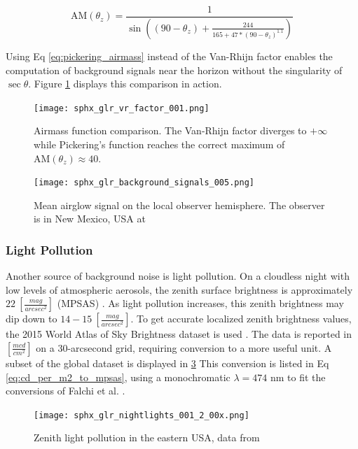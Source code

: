 \begin{equation} \label{eq:pickering_airmass}
  \textrm{AM}(\theta_z) = \frac{1}{\sin\left((90 - \theta_z) +  \frac{244}{165 + 47 * \left(90 - \theta_z \right)^{1.1}}\right)}
\end{equation}

Using Eq \ref{eq:pickering_airmass} instead of the Van-Rhijn factor enables the computation of background signals near the horizon without the singularity of $\sec{\theta}$. Figure \ref{fig:airmass_fcns} displays this comparison in action.

\begin{figure}[ht]
  \centering
  \texttt{[image: sphx\_glr\_vr\_factor\_001.png]}
  \caption{Airmass function comparison. The Van-Rhijn factor diverges to $+\infty$ while Pickering's function reaches the correct maximum of $\textrm{AM}(\theta_z) \approx 40$.}
  \label{fig:airmass_fcns}
\end{figure}

\begin{figure}[ht]
  \centering
  \texttt{[image: sphx\_glr\_background\_signals\_005.png]}
  \caption{Mean airglow signal on the local observer hemisphere. The observer is in New Mexico, USA at
  \pogslla}
  \label{fig:airglowhemi}
\end{figure}

\subsubsection{Light Pollution}

Another source of background noise is light pollution. On a cloudless night with low levels of atmospheric aerosols, 
the zenith surface brightness is approximately $22 \: \left[ \frac{mag}{arcsec^2}
\right]$ (MPSAS) \cite{krag2003}. As light pollution increases, this zenith brightness may dip down to
$14-15 \: \left[ \frac{mag}{arcsec^2} \right]$. To get accurate localized zenith brightness values,
 the 2015 World Atlas of Sky Brightness dataset is used \cite{falchi2016_data}. The data is reported in $\left[
	\frac{mcd}{cm^2} \right]$ on a 30-arcsecond grid, requiring conversion to a more useful unit. A subset of the global dataset is displayed in \ref{fig:pollution_data} This conversion is listed in Eq \ref{eq:cd_per_m2_to_mpsas}, using a monochromatic $\lambda = 474$ nm to fit the conversions of Falchi et al. \cite{falchi2016}.  

\begin{figure}[ht]
  \centering
  \texttt{[image: sphx\_glr\_nightlights\_001\_2\_00x.png]}
  \caption{Zenith light pollution in the eastern USA, data from \cite{falchi2016_data}}
  \label{fig:pollution_data}
\end{figure}

